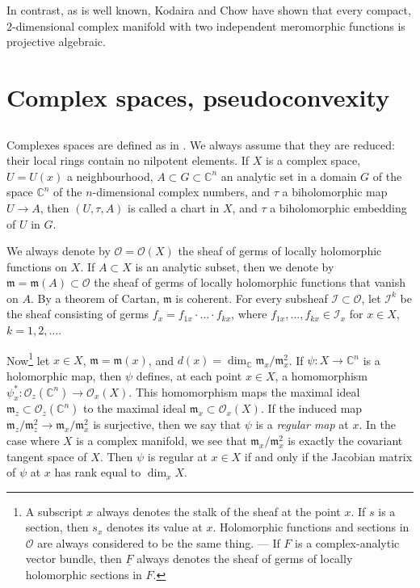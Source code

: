 \documentclass{article}
\theoremstyle{plain}
\newcommand{\scr}[1]{{\mathscr{#1}}}
\newcommand{\CC}{\mathbb{C}}
\newcommand{\fk}{\mathfrak}
\begin{document}
In contrast, as is well known, Kodaira and Chow \cite{4} have shown that every compact, $2$-dimensional complex manifold with two independent meromorphic functions is projective algebraic.


\section{Complex spaces, pseudoconvexity}
\label{1}

\subsection{}
\label{1.1}

Complexes spaces are defined as in \cite{10}.
We always assume that they are reduced: their local rings contain no nilpotent elements.
If $X$ is a complex space, $U=U(x)$ a neighbourhood, $A\subset G\subset \CC^n$ an analytic set in a domain $G$ of the space $\CC^n$ of the $n$-dimensional complex numbers, and $\tau$ a biholomorphic map $U\to A$, then $(U,\tau,A)$ is called a chart in $X$, and $\tau$ a biholomorphic embedding of $U$ in $G$.

We always denote by $\scr{O}=\scr{O}(X)$ the sheaf of germs of locally holomorphic functions on $X$.
If $A\subset X$ is an analytic subset, then we denote by $\fk{m}=\fk{m}(A)\subset\scr{O}$ the sheaf of germs of locally holomorphic functions that vanish on $A$.
By a theorem of Cartan, $\fk{m}$ is coherent.
For every subsheaf $\scr{I}\subset\scr{O}$, let $\scr{I}^k$ be the sheaf consisting of germs $f_x=f_{1x}\cdot\ldots\cdot f_{kx}$, where $f_{1x},\ldots,f_{kx}\in\scr{I}_x$ for $x\in X$, $k=1,2,\ldots$.

Now\footnote{
  A subscript $x$ always denotes the stalk of the sheaf at the point $x$.
  If $s$ is a section, then $s_x$ denotes its value at $x$.
  Holomorphic functions and sections in $\scr{O}$ are always considered to be the same thing.
  --- If $F$ is a complex-analytic vector bundle, then $\underline{F}$ always denotes the sheaf of germs of locally holomorphic sections in $F$.
}
let $x\in X$, $\fk{m}=\fk{m}(x)$, and $d(x)=\dim_\CC\fk{m}_x/\fk{m}_x^2$.
If $\psi\colon X\to\CC^n$ is a holomorphic map, then $\psi$ defines, at each point $x\in X$, a homomorphism $\psi_x^*\colon\scr{O}_z(\CC^n)\to\scr{O}_x(X)$.
This homomorphism maps the maximal ideal $\fk{m}_z\subset\scr{O}_z(\CC^n)$ to the maximal ideal $\fk{m}_x\subset\scr{O}_x(X)$.
If the induced map $\fk{m}_z/\fk{m}_z^2\to\fk{m}_x/\fk{m}_x^2$ is surjective, then we say that $\psi$ is a \emph{regular map} at $x$.
In the case where $X$ is a complex manifold, we see that $\fk{m}_x/\fk{m}_x^2$ is exactly the covariant tangent space of $X$.
Then $\psi$ is regular at $x\in X$ if and only if the Jacobian matrix of $\psi$ at $x$ has rank equal to $\dim_x X$.
\end{document}
